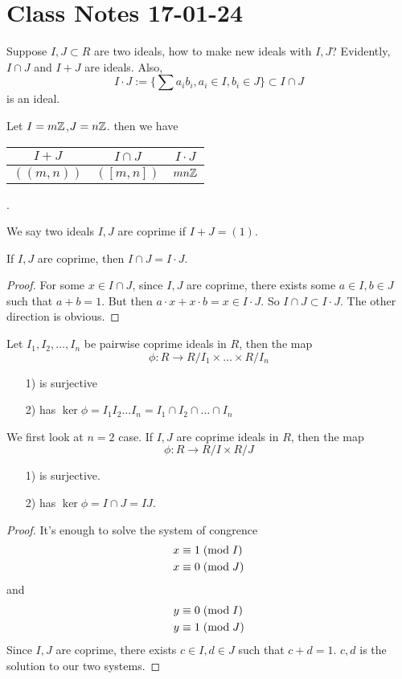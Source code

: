 \section{Class Notes 17-01-24}
Suppose $I,J\subset R$ are two ideals, how to make new ideals with $I,J$? Evidently, $I\cap J$ and $I+J$ are ideals. Also,
$$I\cdot J:=\{\sum a_i b_i, a_i\in I, b_i\in J\}\subset I\cap J$$ is an ideal. 
\begin{example}
Let $I=m\mathbb{Z}$,$J=n\mathbb{Z}$. then we have \quad\begin{tabular}{|c|c|c|}\hline
$I+J$ & $I\cap J$ & $I\cdot J$\\\hline
$((m,n))$ & $([m,n])$ & $mn\mathbb{Z}$\\\hline
\end{tabular}.
\end{example}
\begin{definition}
We say two ideals $I,J$ are coprime if $I+J=(1)$.
\end{definition}
\begin{remark}
If $I, J$ are coprime, then $I\cap J = I\cdot J$.
\end{remark}
\begin{proof}
For some $x\in I\cap J$, since $I,J$ are coprime, there exists some $a\in I, b\in J$ such that $a+b = 1$. But then $a\cdot x + x\cdot b = x\in I\cdot J$. So $I\cap J \subset I\cdot J$. The other direction is obvious.
\end{proof}
\begin{theorem}
Let $I_1, I_2, \ldots, I_n$ be pairwise coprime ideals in $R$, then the map
$$\phi: R\rightarrow R/I_1\times \ldots \times R/I_n$$
\begin{itemize}
\item[1)] is surjective
\item[2)] has $\ker\phi = I_1I_2\ldots I_n = I_1\cap I_2\cap \ldots \cap I_n$
\end{itemize}
\end{theorem}
\begin{lemma}
We first look at $n=2$ case. If $I,J$ are coprime ideals in $R$, then the map
$$\phi: R\rightarrow R/I \times R/J$$
\begin{itemize}
\item[1)] is surjective.
\item[2)] has $\ker\phi = I\cap J = IJ$.
\end{itemize}
\end{lemma}
\begin{proof}
It's enough to solve the system of congrence
\begin{align*}
x&\equiv 1\;(\mbox{mod}{\;I})\\
x&\equiv 0\;(\mbox{mod}{\;J})
\end{align*} and \begin{align*}
y&\equiv 0\;(\mbox{mod}{\;I})\\
y&\equiv 1\;(\mbox{mod}{\;J})
\end{align*}
Since $I,J$ are coprime, there exists $c\in I, d\in J$ such that $c+d = 1$. $c, d$ is the solution to our two systems.
\end{proof}
